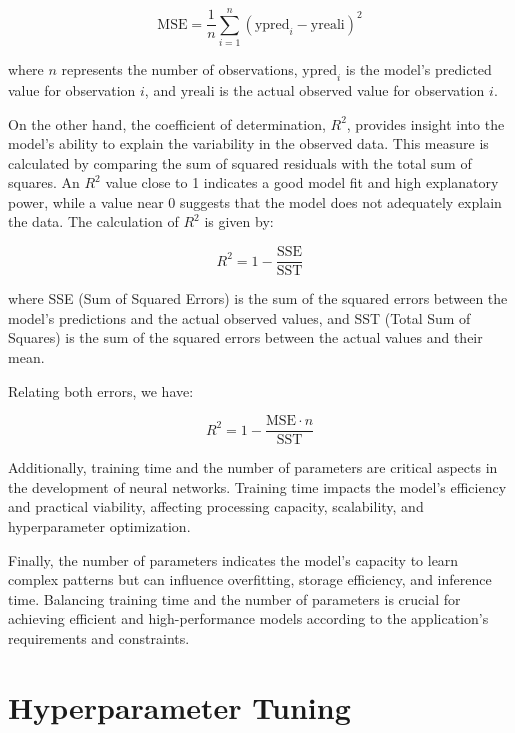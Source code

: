 \begin{equation}
\text{MSE} = \frac{1}{n} \sum_{i=1}^{n} (\text{ypred}_i - \text{yreali})^2
\end{equation}

where \( n \) represents the number of observations, \( \text{ypred}_i \) is the model's predicted value for observation \( i \), and \( \text{yreali} \) is the actual observed value for observation \( i \).

On the other hand, the coefficient of determination, \( R^2 \), provides insight into the model's ability to explain the variability in the observed data. This measure is calculated by comparing the sum of squared residuals with the total sum of squares. An \( R^2 \) value close to 1 indicates a good model fit and high explanatory power, while a value near 0 suggests that the model does not adequately explain the data. The calculation of \( R^2 \) is given by:

\begin{equation}
R^2 = 1 - \frac{\text{SSE}}{\text{SST}}
\end{equation}

where SSE (Sum of Squared Errors) is the sum of the squared errors between the model's predictions and the actual observed values, and SST (Total Sum of Squares) is the sum of the squared errors between the actual values and their mean.

Relating both errors, we have:

\begin{equation}
R^2 = 1 - \frac{\text{MSE} \cdot n}{\text{SST}}
\end{equation}

Additionally, training time and the number of parameters are critical aspects in the development of neural networks. Training time impacts the model's efficiency and practical viability, affecting processing capacity, scalability, and hyperparameter optimization.

Finally, the number of parameters indicates the model's capacity to learn complex patterns but can influence overfitting, storage efficiency, and inference time. Balancing training time and the number of parameters is crucial for achieving efficient and high-performance models according to the application’s requirements and constraints.

\section{Hyperparameter Tuning}

